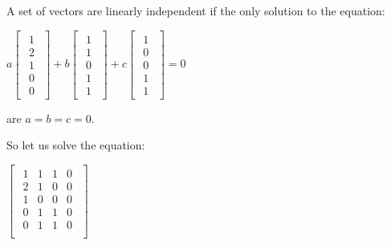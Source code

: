 \singlespacing
\singlespacing

A set of vectors are linearly independent if the only solution to the equation:

\singlespacing
\singlespacing

\begin{math}
    a \begin{bmatrix}
        \begin{array}{c}
            1 \\
            2 \\
            1 \\
            0 \\
            0
        \end{array}
    \end{bmatrix}
    +b \begin{bmatrix}
        \begin{array}{c}
            1 \\
            1 \\
            0 \\
            1 \\
            1
        \end{array}
    \end{bmatrix}
    +c \begin{bmatrix}
        \begin{array}{c}
            1 \\
            0 \\
            0 \\
            1 \\
            1
        \end{array}
    \end{bmatrix}
    = 0
\end{math}

\singlespacing
\singlespacing

are $a = b = c = 0$.

\singlespacing

So let us solve the equation:

\singlespacing
\singlespacing

\begin{math}
    \begin{bmatrix}
        \begin{array}{ccc|c}
            1 & 1 & 1 & 0 \\
            2 & 1 & 0 & 0 \\
            1 & 0 & 0 & 0 \\
            0 & 1 & 1 & 0 \\
            0 & 1 & 1 & 0 \\
        \end{array}
    \end{bmatrix}
\end{math}


